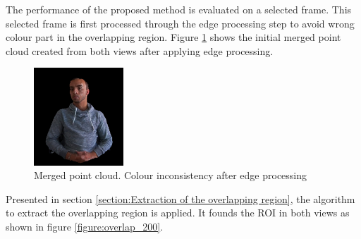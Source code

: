 

The performance of the proposed method is evaluated on a selected frame. This selected frame is first processed through the edge processing step to avoid wrong colour part in the overlapping region. Figure \ref{figure:processed_raw_colour} shows the initial merged point cloud created from both views after applying edge processing.

\begin{figure}[H]
    \centering
    \includegraphics[width=0.3\textwidth]{images/visual_enhancement/colour/processed_raw_colour.png}
    \caption{Merged point cloud. Colour inconsistency after edge processing}
    \label{figure:processed_raw_colour}
\end{figure}


Presented in section \ref{section:Extraction of the overlapping region}, the algorithm to extract the overlapping region is applied. It founds the ROI in both views as shown in figure \ref{figure:overlap_200}.




